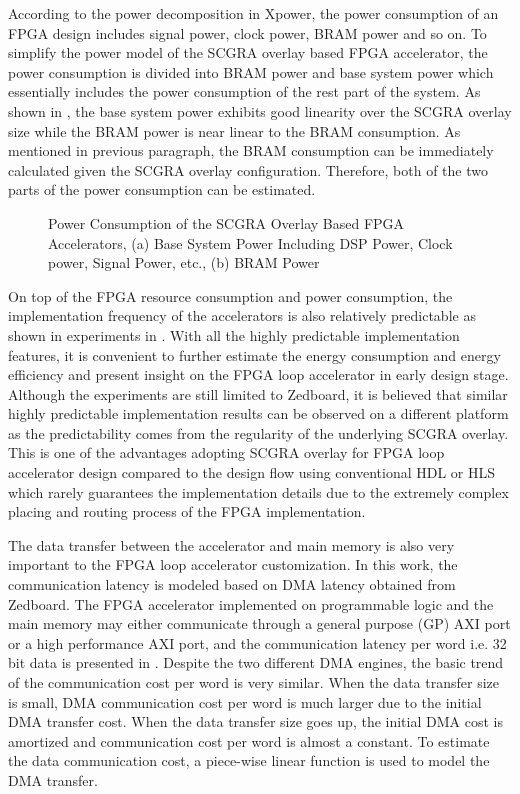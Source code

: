 According to the power decomposition in Xpower, the power consumption of an FPGA design includes signal power, clock power, BRAM power and so on. To simplify the power model of the SCGRA overlay based FPGA accelerator, the power consumption is divided into BRAM power and base system power which essentially includes the power consumption of the rest part of the system. As shown in , the base system power exhibits good linearity over the SCGRA overlay size while the BRAM power is near linear to the BRAM consumption. As mentioned in previous paragraph, the BRAM consumption can be immediately calculated given the SCGRA overlay configuration. Therefore, both of the two parts of the power consumption can be estimated. 

\begin{figure}[htb]
\centering
    \caption{Power Consumption of the SCGRA Overlay Based FPGA Accelerators, (a) Base System Power Including DSP Power, Clock power, Signal Power, etc., (b) BRAM Power}
    \label{fig:SCGRA-Power}
\end{figure}

On top of the FPGA resource consumption and power consumption, the implementation frequency of the accelerators is also relatively predictable as shown in experiments in . With all the highly predictable implementation features, it is convenient to further estimate the energy consumption and energy efficiency and present insight on the FPGA loop accelerator in early design stage. Although the experiments are still limited to Zedboard, it is believed that similar highly predictable implementation results can be observed on a different platform as the predictability comes from the regularity of the underlying SCGRA overlay. This is one of the advantages adopting SCGRA overlay for FPGA loop accelerator design compared to the design flow using conventional HDL or HLS which rarely guarantees the implementation details due to the extremely complex placing and routing process of the FPGA implementation.  

The data transfer between the accelerator and main memory is also very important to the FPGA loop accelerator customization. In this work, the communication latency is modeled based on DMA latency obtained from Zedboard. The FPGA accelerator implemented on programmable logic and the main memory may either communicate through a general purpose (GP) AXI port or a high performance AXI port, and the communication latency per word i.e. 32 bit data is presented in . Despite the two different DMA engines, the basic trend of the communication cost per word is very similar. When the data transfer size is small, DMA communication cost per word is much larger due to the initial DMA transfer cost. When the data transfer size goes up, the initial DMA cost is amortized and communication cost per word is almost a constant. To estimate the data communication cost, a piece-wise linear function is used to model the DMA transfer. 

